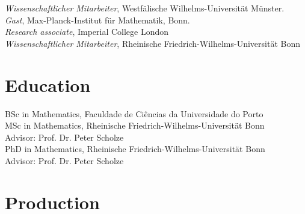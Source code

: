 \documentclass[12pt]{article} %
\begin{document}
 \emph{Wissenschaftlicher Mitarbeiter}, Westfälische Wilhelms-Universität Münster. \\

 \emph{Gast}, Max-Planck-Institut für Mathematik, Bonn. \\

\emph{Research associate}, Imperial College London \\

\emph{Wissenschaftlicher Mitarbeiter}, Rheinische Friedrich-Wilhelms-Universität Bonn


\section*{Education}
BSc in Mathematics, Faculdade de Ciências da Universidade do Porto\\

MSc in Mathematics, Rheinische Friedrich-Wilhelms-Universität Bonn \\ Advisor: Prof. Dr. Peter Scholze \\

PhD in Mathematics, Rheinische Friedrich-Wilhelms-Universität Bonn \\ Advisor: Prof. Dr. Peter Scholze




\section*{Production}
\end{document}
